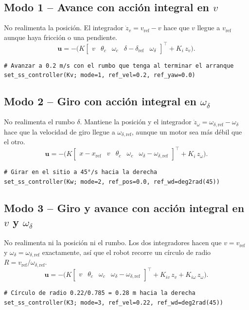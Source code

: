 \documentclass[11pt,letterpaper]{article}
\newcommand{\rf}{\text{ref}}
\newcommand{\vu}{\mathbf{u}}
\begin{document}
\subsection*{Modo 1 -- Avance con acción integral en $v$}
No realimenta la posición. El integrador $\dot z_v=v_\rf-v$ hace que $v$ llegue a $v_\rf$
aunque haya fricción o una pendiente.
\[
  \vu=-\Big(K\begin{bmatrix}v & \theta_c & \omega_c & \delta-\delta_\rf & \omega_\delta\end{bmatrix}^{\!\top}+K_i\,z_v\Big).
\]
\begin{lstlisting}
# Avanzar a 0.2 m/s con el rumbo que tenga al terminar el arranque
set_ss_controller(Kv; mode=1, ref_vel=0.2, ref_yaw=0.0)
\end{lstlisting}

\subsection*{Modo 2 -- Giro con acción integral en $\omega_\delta$}
No realimenta el rumbo $\delta$. Mantiene la posición y el integrador
$\dot z_\omega=\omega_{\delta,\rf}-\omega_\delta$ hace que la velocidad de giro llegue
a $\omega_{\delta,\rf}$, aunque un motor sea más débil que el otro.
\[
  \vu=-\Big(K\begin{bmatrix}x-x_\rf & v & \theta_c & \omega_c & \omega_\delta-\omega_{\delta,\rf}\end{bmatrix}^{\!\top}+K_i\,z_\omega\Big).
\]
\begin{lstlisting}
# Girar en el sitio a 45°/s hacia la derecha
set_ss_controller(Kw; mode=2, ref_pos=0.0, ref_wd=deg2rad(45))
\end{lstlisting}

\subsection*{Modo 3 -- Giro y avance con acción integral en $v$ y $\omega_\delta$}
No realimenta ni la posición ni el rumbo. Los dos integradores hacen que $v=v_\rf$ y
$\omega_\delta=\omega_{\delta,\rf}$ exactamente, así que el robot recorre un círculo de
radio $R=v_\rf/\omega_{\delta,\rf}$.
\[
  \vu=-\Big(K\begin{bmatrix}v & \theta_c & \omega_c & \omega_\delta-\omega_{\delta,\rf}\end{bmatrix}^{\!\top}+K_{iv}\,z_v+K_{i\omega}\,z_\omega\Big).
\]
\begin{lstlisting}
# Círculo de radio 0.22/0.785 = 0.28 m hacia la derecha
set_ss_controller(K3; mode=3, ref_vel=0.22, ref_wd=deg2rad(45))
\end{lstlisting}
\end{document}
